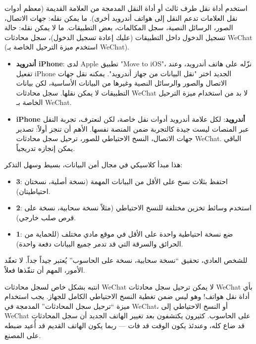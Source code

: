 استخدم أداة نقل طرف ثالث أو أداة النقل المدمجة من العلامة القديمة (معظم أدوات نقل العلامات تدعم النقل إلى هواتف أندرويد أخرى). ما يمكن نقله: جهات الاتصال، الصور، الرسائل النصية، سجل المكالمات، بعض التطبيقات. ما لا يمكن نقله: حالة تسجيل الدخول داخل التطبيقات (عليك إعادة تسجيل الدخول)، سجل محادثات WeChat (استخدم ميزة الترحيل الخاصة بـ WeChat).


\begin{itemize}
  \item \textbf{أندرويد iPhone}: لدى Apple تطبيق "Move to iOS"، نزّله على هاتف أندرويد، وعند تفعيل iPhone الجديد اختر "نقل البيانات من جهاز أندرويد". يمكنه نقل جهات الاتصال والصور والرسائل النصية وغيرها من البيانات الأساسية، لكن بيانات التطبيقات لا يمكن نقلها. سجل محادثات WeChat لا بد من استخدام ميزة الترحيل الخاصة بـ WeChat.
  \item \textbf{iPhone أندرويد}: لكل علامة أندرويد أدوات نقل خاصة، لكن لنعترف، تجربة النقل عبر المنصات ليست جيدة كالتجربة ضمن المنصة نفسها. الأهم أن تنجز أولاً: تصدير جهات الاتصال، النسخ الاحتياطي للصور، ترحيل سجل محادثات WeChat. الباقي يمكن إنجازه تدريجياً.
\end{itemize}


هذا مبدأ كلاسيكي في مجال أمن البيانات، بسيط وسهل التذكر:

\begin{itemize}
  \item \textbf{3}: احتفظ بثلاث نسخ على الأقل من البيانات المهمة (نسخة أصلية، نسختان احتياطيتان).
  \item \textbf{2}: استخدم وسائط تخزين مختلفة للنسخ الاحتياطي (مثلاً نسخة سحابية، نسخة على قرص صلب خارجي).
  \item \textbf{1}: ضع نسخة احتياطية واحدة على الأقل في موقع مادي مختلف (للحماية من الحرائق والسرقة التي قد تدمر جميع البيانات دفعة واحدة).
\end{itemize}

للشخص العادي، تحقيق “نسخة سحابية، نسخة على الحاسوب” يُعتبر جيداً جداً. لا تعقّد الأمور، المهم أن تنفّذها فعلاً.

\begin{tcbwarn}{انتبه بشكل خاص لسجل محادثات WeChat}
لا يمكن ترحيل سجل محادثات WeChat بأي أداة نقل هواتف! وهو ليس ضمن تغطية النسخ الاحتياطي الكامل للجهاز. يجب استخدام ميزة “ترحيل سجل المحادثات” المدمجة في WeChat، أو النسخ الاحتياطي إلى WeChat على الحاسوب. كثيرون يكتشفون بعد تغيير الهاتف الجديد أن سجل المحادثات قد ضاع كله، وعندئذ يكون الوقت قد فات — ربما يكون الهاتف القديم قد أُعيد ضبطه على المصنع.

\end{tcbwarn}

